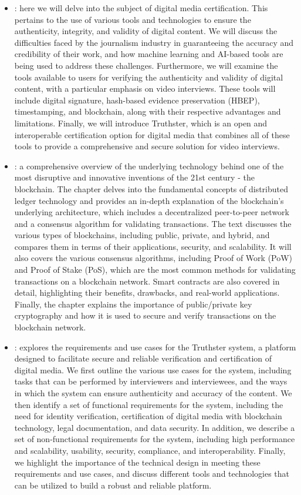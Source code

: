 \documentclass[target=mst,aauheader=]{thud}
\begin{document}
\begin{itemize}

    \item \textbf{}: here we will delve into the subject of digital media certification. This pertains to the use of various tools and technologies to ensure the authenticity, integrity, and validity of digital content. We will discuss the difficulties faced by the journalism industry in guaranteeing the accuracy and credibility of their work, and how machine learning and AI-based tools are being used to address these challenges. Furthermore, we will examine the tools available to users for verifying the authenticity and validity of digital content, with a particular emphasis on video interviews. These tools will include digital signature, hash-based evidence preservation (HBEP), timestamping, and blockchain, along with their respective advantages and limitations. Finally, we will introduce Truthster, which is an open and interoperable certification option for digital media that combines all of these tools to provide a comprehensive and secure solution for video interviews.
    \item \textbf{}: a comprehensive overview of the underlying technology behind one of the most disruptive and innovative inventions of the 21st century - the blockchain. The chapter delves into the fundamental concepts of distributed ledger technology and provides an in-depth explanation of the blockchain's underlying architecture, which includes a decentralized peer-to-peer network and a consensus algorithm for validating transactions. The text discusses the various types of blockchains, including public, private, and hybrid, and compares them in terms of their applications, security, and scalability. It will also covers the various consensus algorithms, including Proof of Work (PoW) and Proof of Stake (PoS), which are the most common methods for validating transactions on a blockchain network. Smart contracts are also covered in detail, highlighting their benefits, drawbacks, and real-world applications. Finally, the chapter explains the importance of public/private key cryptography and how it is used to secure and verify transactions on the blockchain network.
    \item \textbf{}: explores the requirements and use cases for the Truthster system, a platform designed to facilitate secure and reliable verification and certification of digital media. We first outline the various use cases for the system, including tasks that can be performed by interviewers and interviewees, and the ways in which the system can ensure authenticity and accuracy of the content. We then identify a set of functional requirements for the system, including the need for identity verification, certification of digital media with blockchain technology, legal documentation, and data security. In addition, we describe a set of non-functional requirements for the system, including high performance and scalability, usability, security, compliance, and interoperability. Finally, we highlight the importance of the technical design in meeting these requirements and use cases, and discuss different tools and technologies that can be utilized to build a robust and reliable platform.

\end{itemize}
\end{document}
